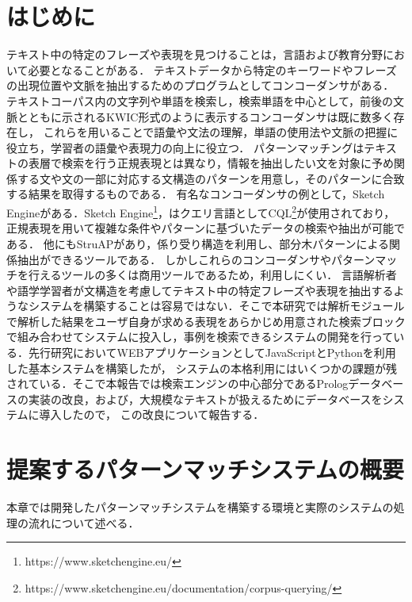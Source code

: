 \documentclass{FITpaper}
\begin{document}
\maketitle

\section{はじめに}
テキスト中の特定のフレーズや表現を見つけることは，言語および教育分野において必要となることがある．
テキストデータから特定のキーワードやフレーズの出現位置や文脈を抽出するためのプログラムとしてコンコーダンサがある．
テキストコーパス内の文字列や単語を検索し，検索単語を中心として，前後の文脈とともに示されるKWIC形式のように表示するコンコーダンサは既に数多く存在し\cite{WebParaNews:2014}\cite{corpusworkshop:2012}，
これらを用いることで語彙や文法の理解，単語の使用法や文脈の把握に役立ち，学習者の語彙や表現力の向上に役立つ．
パターンマッチングはテキストの表層で検索を行う正規表現とは異なり，情報を抽出したい文を対象に予め関係する文や文の一部に対応する文構造のパターンを用意し，そのパターンに合致する結果を取得するものである．
有名なコンコーダンサの例として，Sketch Engineがある．Sketch Engine\footnote{https://www.sketchengine.eu/}，はクエリ言語としてCQL\footnote{https://www.sketchengine.eu/documentation/corpus-querying/}が使用されており，正規表現を用いて複雑な条件やパターンに基づいたデータの検索や抽出が可能である．
他にもStruAP\cite{struAP:2017}があり，係り受り構造を利用し、部分木パターンによる関係抽出ができるツールである．
しかしこれらのコンコーダンサやパターンマッチを行えるツールの多くは商用ツールであるため，利用しにくい．
言語解析者や語学学習者が文構造を考慮してテキスト中の特定フレーズや表現を抽出するようなシステムを構築することは容易ではない．そこで本研究では解析モジュールで解析した結果をユーザ自身が求める表現をあらかじめ用意された検索ブロックで組み合わせてシステムに投入し，事例を検索できるシステムの開発を行っている．先行研究\cite{okada2021}\cite{ogasawara2021}においてWEBアプリケーションとしてJavaScriptとPythonを利用した基本システムを構築したが，
システムの本格利用にはいくつかの課題が残されている．そこで本報告では検索エンジンの中心部分であるPrologデータベースの実装の改良，および，大規模なテキストが扱えるためにデータベースをシステムに導入したので，
この改良について報告する．


\section{提案するパターンマッチシステムの概要}
本章では開発したパターンマッチシステムを構築する環境と実際のシステムの処理の流れについて述べる．
\end{document}
